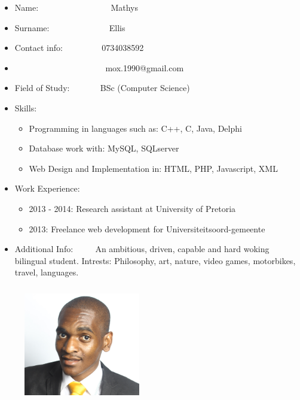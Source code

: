 \documentclass[12pt]{article}
\begin{document}
\begin{itemize}
\item Name: \ ~~~~~~~~~~~~~~ \ Mathys
\item Surname: \ ~~~~~~~~~~~ \ Ellis
\item Contact info: \ ~~~~~~ \ 0734038592
\item \ ~~~~~~~~~~~~~~~~~~~ \ mox.1990@gmail.com
\item Field of Study: \ ~~~~ \ BSc (Computer Science)
\item Skills: \begin{itemize}
\item Programming in languages such as: C++, C, Java, Delphi
\item Database work with: MySQL, SQLserver
\item Web Design and Implementation in: HTML, PHP, Javascript, XML%
\end{itemize}
\item Work Experience: \begin{itemize}
\item 2013 - 2014: Research assistant at University of Pretoria
\item 2013: Freelance web development for Universiteitsoord-gemeente
\end{itemize}
\item Additional Info: \ ~~ \ An ambitious, driven, capable and hard woking bilingual student. Intrests: Philosophy, art, nature, video games, motorbikes, travel, languages.

\end{itemize}


\newpage
\begin{figure}[ht!]
\centering
\includegraphics[width=2in, height=2in]{./Pictures/MbulungoMusetsho.jpg}
\end{figure}
\end{document}
